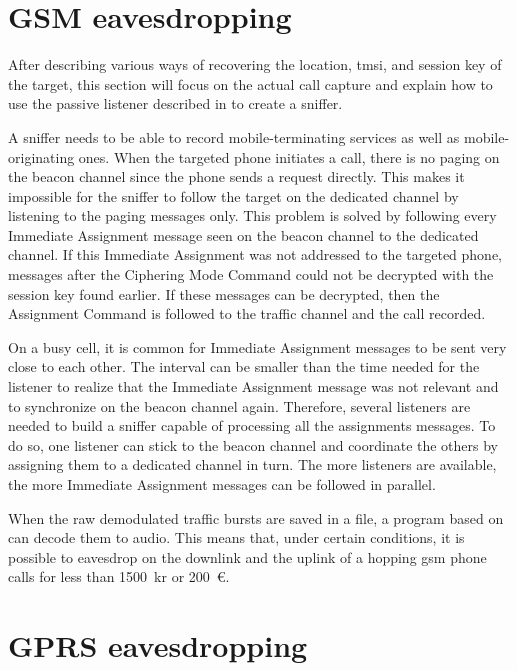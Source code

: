     \section{GSM eavesdropping}

      After describing various ways of recovering the location,
      \gls{tmsi}, and session key of the target, this section will focus
      on the actual call capture and explain how to use the passive
      listener described in  to create a
      sniffer.

      A sniffer needs to be able to record mobile-terminating services
      as well as mobile-originating ones. When the targeted phone
      initiates a call, there is no paging on the beacon channel since
      the phone sends a request directly. This makes it impossible for
      the sniffer to follow the target on the dedicated channel by
      listening to the paging messages only. This problem is solved by
      following every Immediate Assignment message seen on the beacon
      channel to the dedicated channel. If this Immediate Assignment
      was not addressed to the targeted phone, messages after the
      Ciphering Mode Command could not be decrypted with the session key
      found earlier. If these messages can be decrypted, then the
      Assignment Command is followed to the traffic channel and the call
      recorded.

      On a busy cell, it is common for Immediate Assignment messages to
      be sent very close to each other. The interval can be smaller
      than the time needed for the listener to realize that the
      Immediate Assignment message was not relevant and to synchronize
      on the beacon channel again. Therefore, several listeners are
      needed to build a sniffer capable of processing all the
      assignments messages. To do so, one listener can stick to the
      beacon channel and coordinate the others by assigning them to a
      dedicated channel in turn. The more listeners are available, the
      more Immediate Assignment messages can be followed in parallel.

      When the raw demodulated traffic bursts are saved in a file, a
      program based on  can decode them to audio. This
      means that, under certain conditions, it is possible to eavesdrop
      on the downlink and the uplink of a hopping \gls{gsm} phone calls
      for less than \SI{1500}{kr} or \SI{200}{\euro}.

    \section{GPRS eavesdropping}

